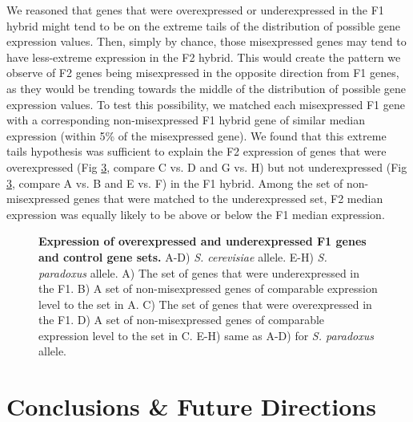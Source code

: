 We reasoned that genes that were overexpressed or underexpressed in the F1 hybrid might tend to be on the extreme tails of the distribution of possible gene expression values. Then, simply by chance, those misexpressed genes may tend to have less-extreme expression in the F2 hybrid. This would create the pattern we observe of F2 genes being misexpressed in the opposite direction from F1 genes, as they would be trending towards the middle of the distribution of possible gene expression values. To test this possibility, we matched each misexpressed F1 gene with a corresponding non-misexpressed F1 hybrid gene of similar median expression (within 5\% of the misexpressed gene). We found that this extreme tails hypothesis was sufficient to explain the F2 expression of genes that were overexpressed (Fig \ref{fig:capt}, compare C vs. D and G vs. H) but not underexpressed (Fig \ref{fig:capt}, compare A vs. B and E vs. F) in the F1 hybrid. Among the set of non-misexpressed genes that were matched to the underexpressed set, F2 median expression was equally likely to be above or below the F1 median expression.

\begin{figure}
    \centering
    \label{fig:hyc}
\end{figure}

\begin{figure}
    \centering
    \label{fig:hyp}
\end{figure}

\begin{figure}
    \centering
    \caption{\textbf{Expression of overexpressed and underexpressed F1 genes and control gene sets.}  A-D) \textit{S. cerevisiae} allele. E-H) \textit{S. paradoxus} allele. A) The set of genes that were underexpressed in the F1. B) A set of non-misexpressed genes of comparable expression level to the set in A. C) The set of genes that were overexpressed in the F1. D) A set of non-misexpressed genes of comparable expression level to the set in C. E-H) same as A-D) for \textit{S. paradoxus} allele.}
    \label{fig:capt}
\end{figure}

\section{Conclusions \& Future Directions}

